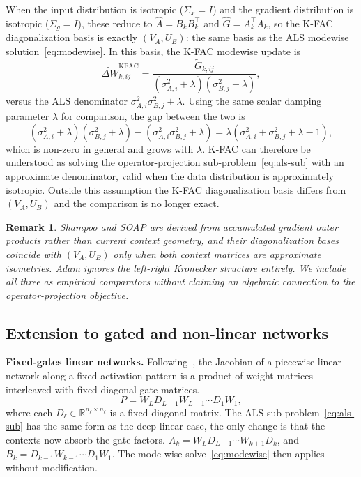 \documentclass{article}
\newtheorem{remark}[theorem]{Remark}
\newcommand{\R}{\mathbb{R}}
\begin{document}
When the input distribution is isotropic ($\Sigma_x = I$) and the gradient
distribution is isotropic ($\Sigma_g = I$), these reduce to
$\hat A = B_k B_k^\top$ and $\hat G = A_k^\top A_k$, so the K-FAC
diagonalization basis is exactly $(V_A, U_B)$:  the same basis as the ALS
modewise solution~\eqref{eq:modewise}.
In this basis, the K-FAC modewise update is
\begin{equation}
  \widetilde{\Delta W}_{k,ij}^{\mathrm{KFAC}}
  = \frac{\widetilde G_{k,ij}}{(\sigma_{A,i}^2 + \lambda)(\sigma_{B,j}^2 + \lambda)},
\end{equation}
versus the ALS denominator $\sigma_{A,i}^2 \sigma_{B,j}^2 + \lambda$. Using the same scalar damping parameter $\lambda$ for comparison, the gap between the two is
\begin{equation}
  (\sigma_{A,i}^2 + \lambda)(\sigma_{B,j}^2 + \lambda)
  - (\sigma_{A,i}^2 \sigma_{B,j}^2 + \lambda)
  = \lambda(\sigma_{A,i}^2 + \sigma_{B,j}^2 + \lambda - 1),
  \label{eq:kfac-gap}
\end{equation}
which is non-zero in general and grows with $\lambda$.
K-FAC can therefore be understood as solving the operator-projection
sub-problem~\eqref{eq:als-sub} with an approximate denominator, valid
when the data distribution is approximately isotropic.
Outside this assumption the K-FAC diagonalization basis differs from
$(V_A, U_B)$ and the comparison is no longer exact.

\begin{remark}
Shampoo and SOAP are derived from accumulated gradient outer products rather
than current context geometry, and their diagonalization bases coincide with
$(V_A, U_B)$ only when both context matrices are approximate isometries.
Adam ignores the left-right Kronecker structure entirely.
We include all three as empirical comparators without claiming an algebraic
connection to the operator-projection objective.
\end{remark}

\subsection{Extension to gated and non-linear networks}
\label{sec:extensions}

\textbf{Fixed-gates linear networks.}
Following~\cite{haas2026jacobian}, the Jacobian of a piecewise-linear network along a fixed activation pattern is a product of weight matrices interleaved with fixed diagonal gate matrices. 
\begin{equation}
  P = W_L D_{L-1} W_{L-1} \cdots D_1 W_1,
  \label{eq:fgln}
\end{equation}
where each $D_\ell \in \R^{n_\ell \times n_\ell}$ is a fixed diagonal matrix.
The ALS sub-problem~\eqref{eq:als-sub} has the same form as the deep linear case, the only change is that the contexts now absorb the gate factors. $A_k = W_L D_{L-1} \cdots W_{k+1} D_k$, and 
  $B_k = D_{k-1} W_{k-1} \cdots D_1 W_1$. The mode-wise solve~\eqref{eq:modewise} then applies without modification.
\end{document}
